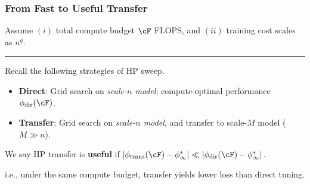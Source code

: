 \begin{frame}
\frametitle{From Fast to Useful Transfer}
\vspace{1.25mm}

{\small
\color{lightgray!60!black} 
Assume $(i)$ total compute budget $\cF$ FLOPS, and $(ii)$ training cost scales as $n^q$. 

\vspace{2.4mm}
\hrule
\vspace{1.5mm}
}

{

\small

Recall the following strategies of HP sweep. 
\vspace{-1.5mm}
\begin{itemize}\setlength\itemsep{0.2em}
    \item[\ding{112}] \colorbox{teal!12}{\textbf{Direct}}: Grid search on \textit{scale-$n$ model}; compute-optimal performance {$\phi_{\text{dir}}(\cF)$}. 
    \item[\ding{112}] \colorbox{teal!12}{\textbf{Transfer}}: Grid search on \textit{scale-$n$ model}, and transfer to scale-$M$ model ($M\gg n$).\!\!\!\! 
\end{itemize}
}


\pause
\vspace{1.5mm}

\begin{alertblock}{}
\centering
We say HP transfer is \textbf{useful} if $\abs{\phi_{\text{trans}}(\cF) - \phi_\infty^*} \ll \abs{\phi_{\text{dir}}(\cF) - \phi_\infty^*}$. 
\end{alertblock}
\vspace{-2.5mm}

{\small
\color{lightgray!60!black} i.e., under the same compute budget, transfer yields lower loss than direct tuning. 
}


\end{frame}
